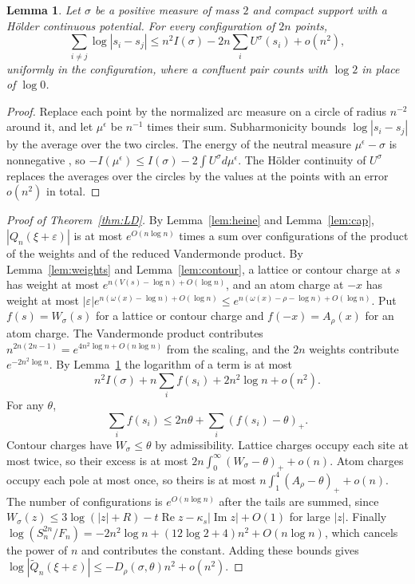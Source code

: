 \documentclass[11pt]{amsart}
\newtheorem{lemma}[theorem]{Lemma}
\theoremstyle{definition}
\theoremstyle{remark}
\numberwithin{equation}{section}
\begin{document}
\begin{lemma}\label{lem:dual}
Let $\sigma$ be a positive measure of mass $2$ and compact support with a H\"older continuous potential. For every
configuration of $2n$ points,
\[
 \sum_{i\ne j}\log|s_i-s_j|\le n^2I(\sigma)-2n\sum_iU^\sigma(s_i)+o(n^2),
\]
uniformly in the configuration, where a confluent pair counts with $\log2$ in place of $\log0$.
\end{lemma}

\begin{proof}
Replace each point by the normalized arc measure on a circle of radius $n^{-2}$ around it, and let $\mu^\epsilon$ be
$n^{-1}$ times their sum. Subharmonicity bounds $\log|s_i-s_j|$ by the average over the two circles. The energy of
the neutral measure $\mu^\epsilon-\sigma$ is nonnegative \cite[Lemma~I.1.8]{SaffTotik}, so
$-I(\mu^\epsilon)\le I(\sigma)-2\int U^\sigma d\mu^\epsilon$. The H\"older continuity of $U^\sigma$ replaces the averages
over the circles by the values at the points with an error $o(n^2)$ in total.
\end{proof}

\begin{proof}[Proof of Theorem~\ref{thm:LD}]
By Lemma~\ref{lem:heine} and Lemma~\ref{lem:cap}, $|Q_n(\xi+\varepsilon)|$ is at most $e^{O(n\log n)}$ times a sum over
configurations of the product of the weights and of the reduced Vandermonde product. By Lemma~\ref{lem:weights} and
Lemma~\ref{lem:contour}, a lattice or contour charge at $s$ has weight at most $e^{n(V(s)-\log n)+O(\log n)}$, and an
atom charge at $-x$ has weight at most $|\varepsilon|e^{n(\omega(x)-\log n)+O(\log n)}\le e^{n(\omega(x)-\rho-\log n)+O(\log n)}$.
Put $f(s)=W_\sigma(s)$ for a lattice or contour charge and $f(-x)=A_\rho(x)$ for an atom charge. The Vandermonde
product contributes $n^{2n(2n-1)}=e^{4n^2\log n+O(n\log n)}$ from the scaling, and the $2n$ weights contribute
$e^{-2n^2\log n}$. By Lemma~\ref{lem:dual} the logarithm of a term is at most
\[
 n^2I(\sigma)+n\sum_if(s_i)+2n^2\log n+o(n^2).
\]
For any $\theta$,
\[
 \sum_if(s_i)\le2n\theta+\sum_i(f(s_i)-\theta)_+ .
\]
Contour charges have $W_\sigma\le\theta$ by admissibility. Lattice charges occupy each site at most twice, so their
excess is at most $2n\int_0^\infty(W_\sigma-\theta)_++o(n)$. Atom charges occupy each pole at most once, so theirs is
at most $n\int_1^4(A_\rho-\theta)_++o(n)$. The number of configurations is $e^{O(n\log n)}$ after the tails are summed,
since $W_\sigma(z)\le3\log(|z|+R)-t\operatorname{Re}z-\kappa_s|\operatorname{Im}z|+O(1)$ for large $|z|$. Finally
$\log(S_n^{2n}/F_n)=-2n^2\log n+(12\log2+4)n^2+O(n\log n)$, which cancels the power of $n$ and contributes the
constant. Adding these bounds gives $\log|\tilde Q_n(\xi+\varepsilon)|\le-D_\rho(\sigma,\theta)n^2+o(n^2)$.
\end{proof}
\end{document}
